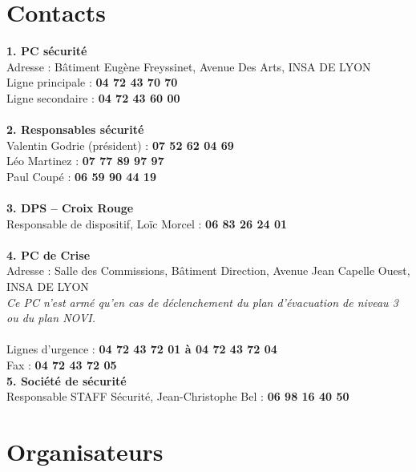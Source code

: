 \documentclass[hidelinks, paper=a4, fontsize=13pt]{report}
\begin{document}
\section{Contacts}
\label{refTelPC}

\textbf{1. PC sécurité}\\
Adresse : Bâtiment Eugène Freyssinet, Avenue Des Arts, INSA DE LYON\\
Ligne principale : \textbf{04 72 43 70 70}\\
Ligne secondaire : \textbf{04 72 43 60 00}\\\\

\textbf{2. Responsables sécurité}\\
Valentin Godrie (président) : \textbf{07 52 62 04 69}\\
Léo Martinez : \textbf{07 77 89 97 97}\\
Paul Coupé : \textbf{06 59 90 44 19}\\
\\

\textbf{3. DPS – Croix Rouge}\\
Responsable de dispositif, Loïc Morcel : \textbf{06 83 26 24 01}\\\\

\textbf{4. PC de Crise}\\
Adresse : Salle des Commissions, Bâtiment Direction, Avenue Jean Capelle Ouest, INSA DE LYON\\
\textit{Ce PC n’est armé qu'en cas de déclenchement du plan d'évacuation de niveau 3 ou du plan NOVI.\\\\
}Lignes d’urgence : 			\textbf{04 72 43 72 01   à 	04 72 43 72 04}\\
Fax : 					\textbf{04 72 43 72 05}\\

\textbf{5. Société de sécurité}\\
Responsable STAFF Sécurité, Jean-Christophe Bel : \textbf{06 98 16 40 50}\\
 
\newpage

\section{Organisateurs}
\label{refTelOrgas}

\tabletail{\hline}
\end{document}
